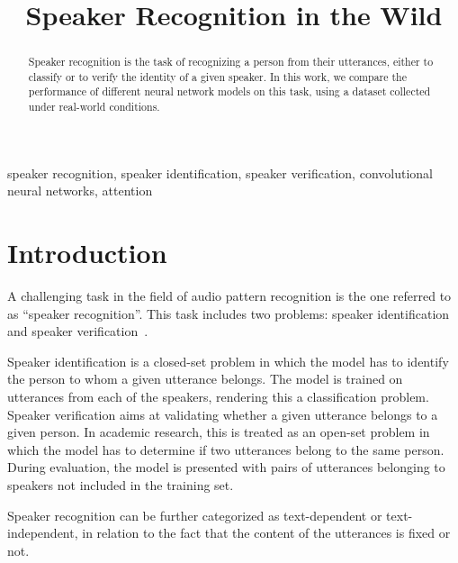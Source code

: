 \documentclass[conference]{IEEEtran}
\begin{document}
\title{Speaker Recognition in the Wild\\}

\author{
}

\maketitle

\begin{abstract}
Speaker recognition is the task of recognizing a person from their utterances, either to classify or to verify the identity of a given speaker. In this work, we compare the performance of different neural network models on this task, using a dataset collected under real-world conditions.  
\end{abstract}

\begin{IEEEkeywords}
speaker recognition, speaker identification, speaker verification, convolutional neural networks, attention
\end{IEEEkeywords}

\section{Introduction}

A challenging task in the field of audio pattern recognition is the one referred to as ``speaker recognition''. This task includes two problems: speaker identification and speaker verification~\cite{kabir2021survey,hajibabaei2018unified,chung2020defence}. 

Speaker identification is a closed-set problem in which the model has to identify the person to whom a given utterance belongs. The model is trained on utterances from each of the speakers, rendering this a classification problem. Speaker verification aims at validating whether a given utterance belongs to a given person. In academic research, this is treated as an open-set problem in which the model has to determine if two utterances belong to the same person. During evaluation, the model is presented with pairs of utterances belonging to speakers not included in the training set.

Speaker recognition can be further categorized as text-dependent or text-independent, in relation to the fact that the content of the utterances is fixed or not.
\end{document}
